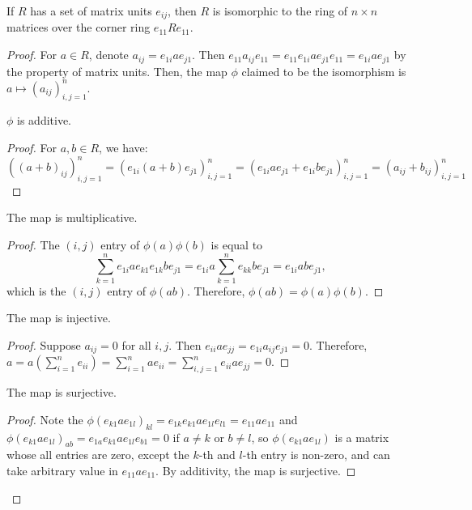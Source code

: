   \begin{theorem}
      \label{thm:ring_with_matrix_units}
      If $R$ has a set of matrix units $e_{ij}$, then $R$ is isomorphic to the ring of $n \times n$ matrices over the corner ring $e_{11}Re_{11}$.
  \end{theorem}
  \begin{proof}
    For $a \in R$, denote $a_{ij} = e_{1i}ae_{j1}$. Then $e_{11}a_{ij}e_{11} = e_{11}e_{1i}ae_{j1}e_{11} = e_{1i}ae_{j1}$ by the property of matrix units. Then, the map $\phi$ claimed to be the isomorphism is $a \mapsto (a_{ij})_{i,j=1}^n$.
    \begin{claim}
      $\phi$ is additive.
    \end{claim}
    \begin{proof}
      For $a, b \in R$, we have:
      $((a + b)_{ij})_{i,j=1}^n = (e_{1i}(a + b)e_{j1})_{i,j=1}^n = (e_{1i}ae_{j1} + e_{1i}be_{j1})_{i,j=1}^n = (a_{ij} + b_{ij})_{i,j=1}^n$
    \end{proof}
    \begin{claim}
      The map is multiplicative.
    \end{claim}
    \begin{proof}
      The $(i,j)$ entry of $\phi(a)\phi(b)$ is equal to 
      $$
        \sum_{k=1}^n e_{1i}ae_{k1}e_{1k}be_{j1} = e_{1i}a \sum_{k=1}^n e_{kk} be_{j1} = e_{1i}abe_{j1},
      $$
      which is the $(i,j)$ entry of $\phi(ab)$. Therefore, $\phi(ab) = \phi(a)\phi(b)$.
    \end{proof}
    \begin{claim}
      The map is injective.
    \end{claim}
    \begin{proof}
      Suppose $a_{ij} = 0$ for all $i, j$. Then $e_{ii}ae_{jj} = e_{1i}a_{ij}e_{j1} = 0$. Therefore, $a = a(\sum_{i=1}^n e_{ii}) = \sum_{i=1}^n ae_{ii} = \sum_{i,j=1}^n e_{ii}ae_{jj} = 0$.
    \end{proof}
    \begin{claim}
      The map is surjective.
    \end{claim}
    \begin{proof}
      Note the $\phi(e_{k1}ae_{1l})_{kl} = e_{1k}e_{k1}a e_{1l}e_{l1} = e_{11}ae_{11}$ and $\phi(e_{k1}ae_{1l})_{ab} = e_{1a}e_{k1}a e_{1l}e_{b1} = 0$ if $a \neq k$ or $b \neq l$, so $\phi(e_{k1}ae_{1l})$ is a matrix whose all entries are zero, except the $k$-th and $l$-th entry is non-zero, and can take arbitrary value in $e_{11}ae_{11}$. By additivity, the map is surjective.
    \end{proof}

  \end{proof}

